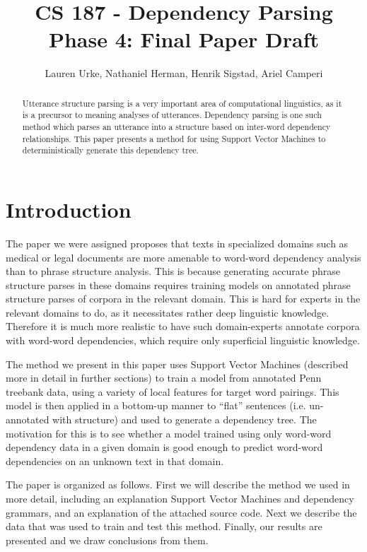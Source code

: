\documentclass[12pt]{amsart}
\title{CS 187 - Dependency Parsing\\Phase 4: Final Paper Draft}
\author{Lauren Urke, Nathaniel Herman, Henrik Sigstad, Ariel Camperi}
\date{}
\begin{document}
    \begin{abstract}
    Utterance structure parsing is a very important area of computational linguistics, as it is a precursor to meaning analyses of utterances. Dependency parsing is one such method which parses an utterance into a structure based on inter-word dependency relationships. This paper presents a method for using Support Vector Machines to deterministically generate this dependency tree.
    \end{abstract}

    \maketitle

\section{Introduction}
The paper we were assigned \cite{yamada2003statistical} proposes that texts in specialized domains such as medical or legal documents are more amenable to word-word dependency analysis than to phrase structure analysis. This is because generating accurate phrase structure parses in these domains requires training models on annotated phrase structure parses of corpora in the relevant domain. This is hard for experts in the relevant domains to do, as it necessitates rather deep linguistic knowledge. Therefore it is much more realistic to have such domain-experts annotate corpora with word-word dependencies, which require only superficial linguistic knowledge.

The method we present in this paper uses Support Vector Machines (described more in detail in further sections) to train a model from annotated Penn treebank data, using a variety of local features for target word pairings. This model is then applied in a bottom-up manner to ``flat'' sentences (i.e. un-annotated with structure) and used to generate a dependency tree. The motivation for this is to see whether a model trained using only word-word dependency data in a given domain is good enough to predict word-word dependencies on an unknown text in that domain.

The paper is organized as follows. First we will describe the method we used in more detail, including an explanation Support Vector Machines and dependency grammars, and an explanation of the attached source code. Next we describe the data that was used to train and test this method. Finally, our results are presented and we draw conclusions from them.
\end{document}
